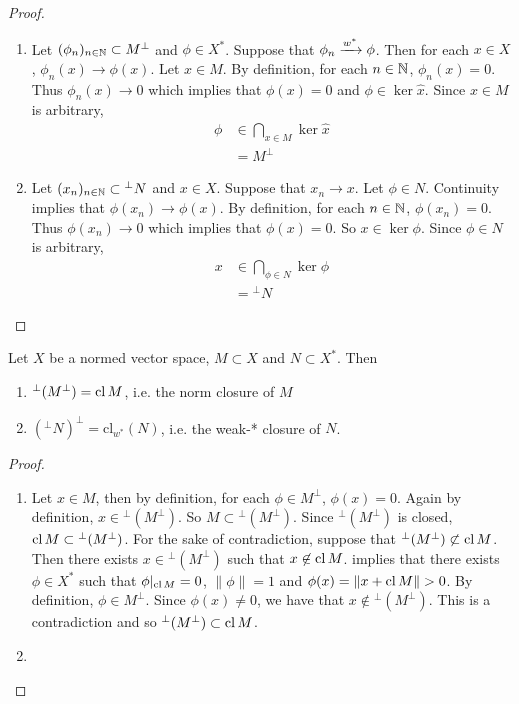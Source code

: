\documentclass{book}
\begin{document}
	\begin{proof}\
	\begin{enumerate}
	\item Let $(\phi_n)_{n \in \mathbb{N}} \subset M^{\perp}$ and $\phi \in X^*$. Suppose that $\phi_n \xrightarrow{w^*} \phi$. Then for each $x \in X$, $\phi_n(x) \rightarrow \phi(x)$. Let $x \in M$. By definition, for each $n \in \mathbb{N}$, $\phi_n(x) = 0$. Thus $\phi_n(x) \rightarrow 0$ which implies that $\phi(x) = 0$ and $\phi \in \ker \hat{x}$. Since $x \in M$ is arbitrary, 
	\begin{align*}
	\phi 
	&\in \bigcap_{x \in M} \ker \hat{x} \\
	&= M^{\perp}
	\end{align*}
	\item Let $(x_n)_{n \in \mathbb{N}} \subset {^{\perp} N}$ and $x \in X$. Suppose that $x_n \rightarrow x$. Let $\phi \in N$. Continuity implies that $\phi(x_n) \rightarrow \phi(x)$. By definition, for each $n \in \mathbb{N}$, $\phi(x_n) = 0$. Thus $\phi(x_n) \rightarrow 0$ which implies that $\phi(x) = 0$. So $x \in \ker \phi$. Since $\phi \in N$ is arbitrary, 
	\begin{align*}
	x 
	&\in \bigcap_{\phi \in N} \ker \phi \\
	&= {^{\perp}N}
	\end{align*}
	\end{enumerate}
	\end{proof}
	
	\begin{ex}
	Let $X$ be a normed vector space, $M \subset X$ and $N \subset X^*$. Then 
	\begin{enumerate}
	\item $^{\perp}(M^{\perp}) = \operatorname{cl} M$, i.e. the norm closure of $M$
	\item $({^{\perp}N})^{\perp} = \text{cl}_{w^*}(N)$, i.e. the weak-* closure of $N$.
	\end{enumerate}
	\end{ex}
	
	\begin{proof}\
	\begin{enumerate}
	\item Let $x \in M$, then by definition, for each $\phi \in M^{\perp}$, $\phi(x) = 0$. Again by definition, $x \in {^{\perp}(M^{\perp})}$. So $M \subset {^{\perp}(M^{\perp})}$. Since ${^{\perp}(M^{\perp})}$ is closed, $\operatorname{cl} M \subset {^{\perp}(M^{\perp})}$. For the sake of contradiction, suppose that ${^{\perp}(M^{\perp})} \not \subset \operatorname{cl} M$. Then there exists $x \in {^{\perp}(M^{\perp})}$ such that $x \not \in \operatorname{cl} M$.  implies that there exists $\phi \in X^*$ such that $\phi|_{\operatorname{cl} M} = 0$, $\|\phi\| = 1$ and $\phi(x) = \|x + \operatorname{cl} M\| > 0$. By definition, $\phi \in M^{\perp}$. Since $\phi(x) \neq 0$, we have that $x \not \in {^{\perp}(M^{\perp})}$. This is a contradiction and so ${^{\perp}(M^{\perp})} \subset \operatorname{cl} M$.
	\item 
	\end{enumerate}
	\end{proof}
	
\end{document}
